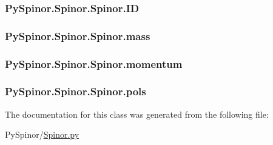 \subsubsection[{I\+D}]{\setlength{\rightskip}{0pt plus 5cm}Py\+Spinor.\+Spinor.\+Spinor.\+I\+D}\label{class_py_spinor_1_1_spinor_1_1_spinor_a3a07111900e024ddfacd6b0562d36f11}
\hypertarget{class_py_spinor_1_1_spinor_1_1_spinor_a519f8be747d03caa97141c1d0146cd1c}{}
\subsubsection[{mass}]{\setlength{\rightskip}{0pt plus 5cm}Py\+Spinor.\+Spinor.\+Spinor.\+mass}\label{class_py_spinor_1_1_spinor_1_1_spinor_a519f8be747d03caa97141c1d0146cd1c}
\hypertarget{class_py_spinor_1_1_spinor_1_1_spinor_a0e1deed1ae598a4bda4a648422975cee}{}
\subsubsection[{momentum}]{\setlength{\rightskip}{0pt plus 5cm}Py\+Spinor.\+Spinor.\+Spinor.\+momentum}\label{class_py_spinor_1_1_spinor_1_1_spinor_a0e1deed1ae598a4bda4a648422975cee}
\hypertarget{class_py_spinor_1_1_spinor_1_1_spinor_ade40e15caea3f801f46629f948e33137}{}
\subsubsection[{pols}]{\setlength{\rightskip}{0pt plus 5cm}Py\+Spinor.\+Spinor.\+Spinor.\+pols}\label{class_py_spinor_1_1_spinor_1_1_spinor_ade40e15caea3f801f46629f948e33137}


The documentation for this class was generated from the following file\+:\begin{DoxyCompactItemize}
\item 
Py\+Spinor/\hyperlink{_spinor_8py}{Spinor.\+py}\end{DoxyCompactItemize}
